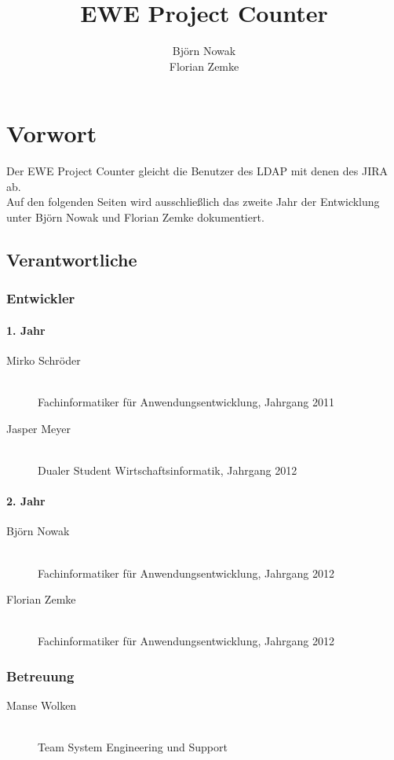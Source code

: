 \documentclass[a4paper,12pt]{report}
\author{Björn Nowak\\Florian Zemke}
\title{EWE Project Counter}
\begin{document}
 

\maketitle %
\tableofcontents %

\chapter{Vorwort}
	Der EWE Project Counter gleicht die Benutzer des LDAP mit denen des JIRA ab.\\Auf den folgenden Seiten wird ausschließlich das zweite Jahr der Entwicklung unter Björn Nowak und Florian Zemke dokumentiert.
	
	\section{Verantwortliche}

	\subsection{Entwickler}
	
	\subsubsection{1. Jahr}
	\begin{description}
	\item[Mirko Schröder] \hfill \\
	Fachinformatiker für Anwendungsentwicklung, Jahrgang 2011
	\item[Jasper Meyer] \hfill \\
	Dualer Student Wirtschaftsinformatik, Jahrgang 2012
	\end{description}
	
	\subsubsection{2. Jahr}
	\begin{description}	
	\item[Björn Nowak] \hfill \\
	Fachinformatiker für Anwendungsentwicklung, Jahrgang 2012
	\item[Florian Zemke] \hfill \\
	Fachinformatiker für Anwendungsentwicklung, Jahrgang 2012
	\end{description}
	
	\subsection{Betreuung}
	\begin{description}
	\item[Manse Wolken] \hfill \\
	Team System Engineering und Support
	\end{description}
	
\end{document}

